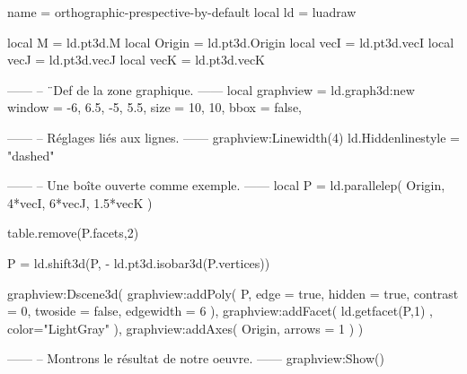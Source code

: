 \documentclass[border = 3pt]{standalone}
\begin{document}
\begin{luadraw*}{name = orthographic-prespective-by-default}
local ld = luadraw

local M      = ld.pt3d.M
local Origin = ld.pt3d.Origin
local vecI   = ld.pt3d.vecI
local vecJ   = ld.pt3d.vecJ
local vecK   = ld.pt3d.vecK

------
-- ¨Def de la zone graphique.
------
local graphview = ld.graph3d:new{
  window  = {-6, 6.5, -5, 5.5},
  size    = {10, 10},
  bbox    = false,
}

------
-- Réglages liés aux lignes.
------
graphview:Linewidth(4)
ld.Hiddenlinestyle = "dashed"

------
-- Une boîte ouverte comme exemple.
------
local P = ld.parallelep(
  Origin,
  4*vecI, 6*vecJ, 1.5*vecK
)

table.remove(P.facets,2)

P = ld.shift3d(P, - ld.pt3d.isobar3d(P.vertices))

graphview:Dscene3d(
  graphview:addPoly(
    P,
    {
      edge      = true,
      hidden    = true,
      contrast  = 0,
      twoside   = false,
      edgewidth = 6
    }
  ),
  graphview:addFacet(
    ld.getfacet(P,1) ,
    {
      color="LightGray"
    }
  ),
  graphview:addAxes(
    Origin,
    {
      arrows = 1
    }
  )
)

------
-- Montrons le résultat de notre oeuvre.
------
graphview:Show()
\end{luadraw*}
\end{document}

